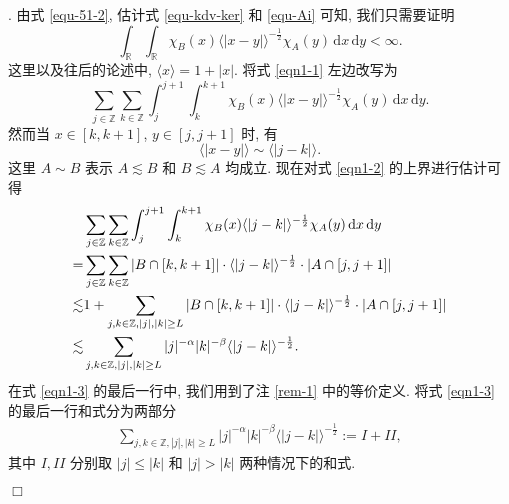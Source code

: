 \documentclass[master]{cugthesis}
\renewcommand\d{\ensuremath{\,\mathrm{d}}}
\newenvironment{proof}{{\noindent\itshape 证明}.}{\hfill $\Box$\par}
\begin{document}
\begin{proof}
由式 \eqref{equ-51-2}, 估计式 \eqref{equ-kdv-ker} 和 \eqref{equ-Ai} 可知, 我们只需要证明
    \begin{equation}
       \int_{\mathbb{R}}\int_{\mathbb{R}}\chi_B(x)\langle|x-y|\rangle^{-\frac{1}{2}}\chi_A(y)\d x\d y<\infty.\label{eqn1-1}
    \end{equation}
这里以及往后的论述中, $\langle x \rangle = 1+|x|$.
    将式 \eqref{eqn1-1} 左边改写为
    \begin{equation}
       \sum_{j\in \mathbb{Z}}\sum_{k\in\mathbb{Z}}\int_j^{j+1}\int_k^{k+1}\chi_B(x)\langle|x-y|\rangle^{-\frac{1}{2}}\chi_A(y)\d x\d y.\label{eqn1-2}
    \end{equation}
    然而当 $x\in [k,k+1]$, $y\in[j,j+1]$ 时, 有
    $$
       \langle|x-y|\rangle\sim \langle|j-k|\rangle.
    $$
这里 $A\sim B$ 表示 $A\lesssim B$ 和 $B\lesssim A$ 均成立.
    现在对式 \eqref{eqn1-2} 的上界进行估计可得
    \begin{align}
       &\sum_{j\in \mathbb{Z}}\sum_{k\in\mathbb{Z}}\int_j^{j+1}\int_k^{k+1}\chi_B(x)\langle|j-k|\rangle^{-\frac{1}{2}}\chi_A(y)\d x\d y\notag\\
       =&\sum_{j\in\mathbb{Z}}\sum_{k\in\mathbb{Z}}|B\cap [k,k+1]|\cdot \langle|j-k|\rangle^{-\frac{1}{2}}\cdot |A\cap [j,j+1]|\notag\\
       \lesssim & 1+\sum_{j,k\in\mathbb{Z},|j|,|k|\ge L} |B\cap[k,k+1]|\cdot \langle|j-k|\rangle^{-\frac{1}{2}}\cdot|A\cap [j,j+1]|\notag\\
       \lesssim & \sum_{j,k\in\mathbb{Z},|j|,|k|\ge L} |j|^{-\alpha}|k|^{-\beta}\langle |j-k|\rangle^{-\frac{1}{2}}.\label{eqn1-3}
    \end{align}
在式 \eqref{eqn1-3} 的最后一行中, 我们用到了注 \ref{rem-1} 中的等价定义.
 将式 \eqref{eqn1-3} 的最后一行和式分为两部分
 \begin{align}\label{equ-426-10}
 \sum_{j,k\in\mathbb{Z},|j|,|k|\ge L} |j|^{-\alpha}|k|^{-\beta}\langle |j-k|\rangle^{-\frac{1}{2}}:= I+II,
 \end{align}
 其中 $I, II$ 分别取  $|j|\leq |k|$ 和 $|j|>|k|$ 两种情况下的和式.


\end{proof}
\end{document}
